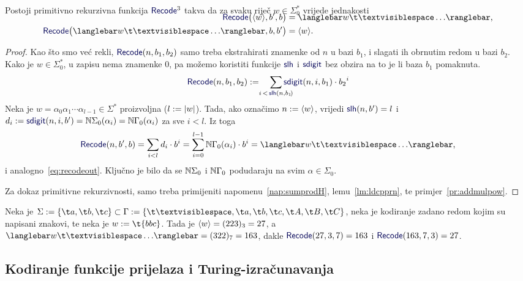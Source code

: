 \begin{lema}[{name=[primitivna rekurzivnost \emph{input\slash output} sustava trake]}]\label{lm:recodeprn}
Postoji primitivno rekurzivna funkcija $\f{Recode}^3$ takva da za svaku riječ $w\in\Sigma_0^*$ vrijede jednakosti
\begin{align}
\SwapAboveDisplaySkip
    \label{eq:recodein}\f{Recode}\bigl(\kr w,b',b\bigr)&=\knk{w\bl\ldots}\text,\\
    \label{eq:recodeout}\f{Recode}\bigl(\knk{w\bl\ldots},b,b'\bigr)&=\kr w\text.
\end{align}
\end{lema}
\begin{proof}
Kao što smo već rekli, $\f{Recode}(n,b_1,b_2)$ samo treba ekstrahirati znamenke od $n$ u bazi $b_1$, i slagati ih obrnutim redom u bazi $b_2$. Kako je $w\in\Sigma_0^*$, u zapisu nema znamenke $0$, pa 
možemo koristiti funkcije $\f{slh}$ i $\f{sdigit}$ bez obzira na to je li baza $b_1$ pomaknuta.
\begin{equation}
    \f{Recode}(n,b_1,b_2):=\quad\sum_{\mathclap{i\,<\,\f{slh}(n,b_1\!)}}\f{sdigit}(n,i,b_1)\cdot{b_2}^i
\end{equation}
Neka je $w=\alpha_0\alpha_1\dotsm\alpha_{l-1}\in\Sigma^*$ proizvoljna ($l:=\lvert w\rvert$). Tada, ako označimo $n:=\langle w\rangle$, vrijedi $\f{slh}(n,b')=l$ i $d_i:=\f{sdigit}(n,i,b')=\N\Sigma_0(\alpha_i)=\N\Gamma_0(\alpha_i)$ za sve $i<l$. Iz toga
\begin{equation}
    \f{Recode}(n,b',b)=\sum_{i<l}d_i\cdot b^i=\sum_{i=0}^{l-1}\N\Gamma_0(\alpha_i)\cdot b^i=\knk{w\bl\ldots}\text,
\end{equation}
i analogno~\eqref{eq:recodeout}. Ključno je bilo da se ${\mathbb N}\Sigma_0$ i ${\mathbb N}\Gamma_0$ podudaraju na svim $\alpha\in\Sigma_0$.

    Za dokaz primitivne rekurzivnosti, samo treba primijeniti napomenu~\ref{nap:sumprodH}, lemu~\ref{lm:ldcpprn}, te primjer~\ref{pr:addmulpow}.
\end{proof}

\begin{primjer}[{name=[korištenje \emph{input\slash output} sustava trake]}]
Neka je $\Sigma:=\{\t a,\t b,\t c\}\subset\Gamma:=\{\bl,\t a,\t b,\t c,\t A,\t B,\t C\}$, neka je kodiranje zadano redom kojim su napisani znakovi, te neka je $w:=\t{bbc}$. Tada je $\langle w\rangle=(223)_3=27$, a $\knk{w\bl\ldots}=(322)_7=163$, dakle $\f{Recode}(27,3,7)=163$ i $\f{Recode}(163,7,3)=27$.
\end{primjer}

\subsection{Kodiranje funkcije prijelaza i Turing-izračunavanja}

